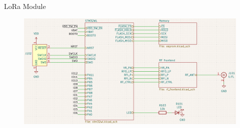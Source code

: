 \documentclass{beamer}
\begin{document}
\begin{frame}{LoRa Module}
\begin{figure}
    \centering
    \includegraphics[width=\linewidth]{img/module-schema.png}
\end{figure}
\end{frame}
\end{document}
